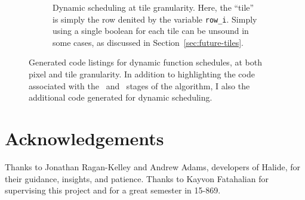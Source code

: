 \documentclass{article}
\begin{document}
\begin{figure}[t]
\begin{center}
\begin{subfigure}[b]{0.475\textwidth}
\begin{center}
		\end{center}
		\caption{Dynamic scheduling at tile granularity. Here, the ``tile'' is simply the row denited by the variable \texttt{row\_i}. Simply using a single boolean for each tile can be unsound in some cases, as discussed in Section~\ref{sec:future-tiles}.}
		\label{fig:dynamic-tile}
	\end{subfigure}
	\end{center}
	\caption{Generated code listings for dynamic function schedules, at both pixel and tile granularity. In addition to highlighting the code associated with the ~and ~stages of the algorithm, I also {\bf {}} the additional code generated for dynamic scheduling.}
	\label{fig:dynamic}
\end{figure}

\section*{Acknowledgements}

Thanks to Jonathan Ragan-Kelley and Andrew Adams, developers of Halide, for their guidance, insights, and patience. Thanks to Kayvon Fatahalian for supervising this project and for a great semester in 15-869.

{}

\end{document}
